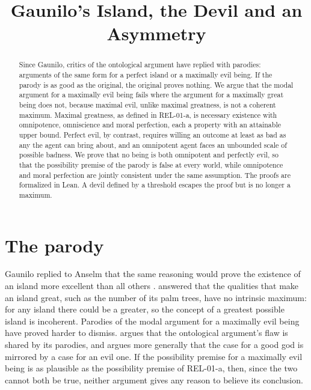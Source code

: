 \documentclass{situationist-preprint}
\title{Gaunilo's Island, the Devil and an Asymmetry}
\begin{document}
\maketitle

\begin{abstract}
Since Gaunilo, critics of the ontological argument have replied with parodies: arguments of the same form for a perfect island or a maximally evil being. If the parody is as good as the original, the original proves nothing. We argue that the modal argument for a maximally evil being fails where the argument for a maximally great being does not, because maximal evil, unlike maximal greatness, is not a coherent maximum. Maximal greatness, as defined in REL-01-a, is necessary existence with omnipotence, omniscience and moral perfection, each a property with an attainable upper bound. Perfect evil, by contrast, requires willing an outcome at least as bad as any the agent can bring about, and an omnipotent agent faces an unbounded scale of possible badness. We prove that no being is both omnipotent and perfectly evil, so that the possibility premise of the parody is false at every world, while omnipotence and moral perfection are jointly consistent under the same assumption. The proofs are formalized in Lean. A devil defined by a threshold escapes the proof but is no longer a maximum.
\end{abstract}

\section{The parody}

Gaunilo replied to Anselm that the same reasoning would prove the existence of an island more excellent than all others \citep{Gaunilo}. \citet{Plantinga1974} answered that the qualities that make an island great, such as the number of its palm trees, have no intrinsic maximum: for any island there could be a greater, so the concept of a greatest possible island is incoherent. Parodies of the modal argument for a maximally evil being have proved harder to dismiss. \citet{Millican2004} argues that the ontological argument's flaw is shared by its parodies, and \citet{Law2010} argues more generally that the case for a good god is mirrored by a case for an evil one. If the possibility premise for a maximally evil being is as plausible as the possibility premise of REL-01-a, then, since the two cannot both be true, neither argument gives any reason to believe its conclusion.
\end{document}
